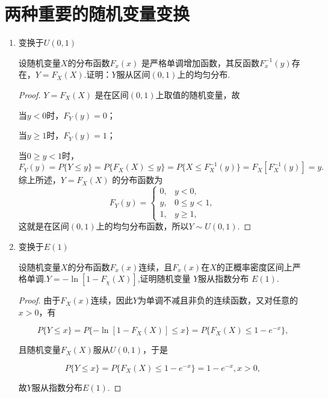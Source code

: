 \section{两种重要的随机变量变换}

\begin{enumerate}
    \item 变换于$U(0,1)$
          \begin{example}{}{}
              设随机变量$X$的分布函数$F_x(x)$ 是严格单调增加函数，其反函数$F_x^{-1}(y)$存在，$Y=F_X(X)$.证明：$Y$服从区间$(0,1)$上的均匀分布.
          \end{example}
          \begin{proof}
              $Y = F_{X}(X)$ 是在区间$(0,1)$上取值的随机变量，故

              当$y<0$时，$F_{Y}(y)=0$；

              当$y\ge 1$时，$F_{Y}(y)=1$；

              当$0\ge y<1$时，
              $$F_{Y}(y)=P\{Y\le y\}=P\{F_{X}(X)\le y\}=P\{X\le F_{X}^{-1}(y)\}=F_{X}[F_{X}^{-1}(y)]=y.$$
              综上所述，$Y = F_{X}(X)$ 的分布函数为
              $$
                  F_{Y}(y)=\begin{cases}0,&y<0,\\y,&0\le y<1,\\1,&y\ge 1,\end{cases}$$
              这就是在区间$(0,1)$上的均匀分布函数，所以$Y\sim U(0,1)$.
          \end{proof}
    \item 变换于$E(1)$
          \begin{example}{}{}
              设随机变量$X$的分布函数$F_x(x)$连续，且$F_x(x)$在$X$的正概率密度区间上严格单调.$Y=-\ln[1-F_{\chi}(X)]$,证明随机变量 $Y$服从指数分布 $E(1).$
          \end{example}
          \begin{proof}
              由于$F_{X}(x)$连续，因此$Y$为单调不减且非负的连续函数，又对任意的$x>0$，有

              $$P\{Y\leqslant x\}=P\{-\ln[1-F_{X}(X)]\leqslant x\}=P\{F_{X}(X)\leqslant 1-e^{-x}\},$$

              且随机变量$F_{X}(X)$服从$U(0,1)$，于是

              $$P\{Y\leqslant x\}=P\{F_{X}(X)\leqslant 1-e^{-x}\}=1-e^{-x},x>0,$$

              故$Y$服从指数分布$E(1)$.
          \end{proof}
\end{enumerate}
